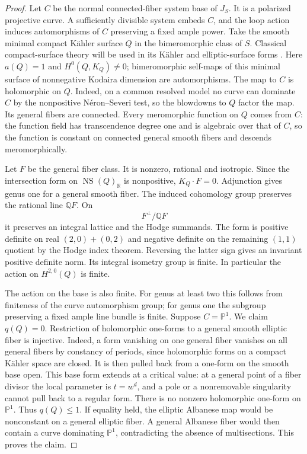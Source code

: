 \documentclass[11pt,letterpaper]{article}
\theoremstyle{definition}
\theoremstyle{remark}
\begin{document}
\begin{proof}
Let $C$ be the normal connected-fiber system base of $J_S$.
It is a polarized projective curve.  A sufficiently divisible
system embeds $C$, and the loop action induces automorphisms of
$C$ preserving a fixed ample power.  Take the smooth minimal
compact K\"ahler surface $Q$ in the bimeromorphic class of $S$.
Classical compact-surface theory will be used in its K\"ahler
and elliptic-surface forms \cite{BHPV}.  Here $a(Q)=1$ and
$H^0(Q,K_Q)\ne0$; bimeromorphic self-maps of this minimal
surface of nonnegative Kodaira dimension are automorphisms.
The map to $C$ is holomorphic on $Q$.  Indeed, on a common
resolved model no curve can dominate $C$ by the nonpositive
N\'eron--Severi test, so the blowdowns to $Q$ factor the map.
Its general fibers are connected.  Every meromorphic function
on $Q$ comes from $C$: the function field has transcendence
degree one and is algebraic over that of $C$, so the function
is constant on connected general smooth fibers and descends
meromorphically.

Let $F$ be the general fiber class.  It is nonzero, rational
and isotropic.  Since the intersection form on $\operatorname{NS}(Q)_\mathbb{R}$
is nonpositive, $K_Q\cdot F=0$.  Adjunction gives genus one
for a general smooth fiber.  The induced cohomology group
preserves the rational line $\mathbb{Q} F$.  On
\begin{equation}
 \label{floor:isotropic-quotient}
 F^\perp/\mathbb{Q} F
\end{equation}
it preserves an integral lattice and the Hodge summands.  The
form is positive definite on real $(2,0)+(0,2)$ and negative
definite on the remaining $(1,1)$ quotient by the Hodge index
theorem.  Reversing the latter sign gives an invariant positive
definite norm.  Its integral isometry group is finite.  In
particular the action on $H^{2,0}(Q)$ is finite.

The action on the base is also finite.  For genus at least two
this follows from finiteness of the curve automorphism group;
for genus one the subgroup preserving a fixed ample line
bundle is finite.  Suppose $C=\mathbb{P}^1$.  We claim $q(Q)=0$.
Restriction of holomorphic one-forms to a general smooth
elliptic fiber is injective.  Indeed, a form vanishing on one
general fiber vanishes on all general fibers by constancy of
periods, since holomorphic forms on a compact K\"ahler space
are closed.  It is then pulled back from a one-form on the
smooth base open.  This base form extends at a critical value:
at a general point of a fiber divisor the local parameter is
$t=w^d$, and a pole or a nonremovable singularity cannot
pull back to a regular form.  There is no nonzero holomorphic
one-form on $\mathbb{P}^1$.  Thus $q(Q)\le1$.  If equality held,
the elliptic Albanese map would be nonconstant on a general
elliptic fiber.  A general Albanese fiber would then contain
a curve dominating $\mathbb{P}^1$, contradicting the absence of
multisections.  This proves the claim.


\end{proof}
\end{document}
